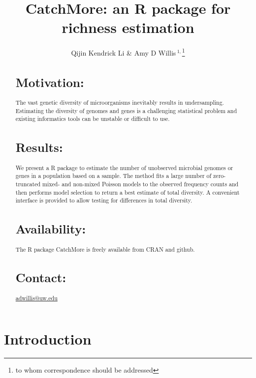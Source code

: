 \documentclass{bioinfo}
\begin{document}

\title[Convenient estimation of species richness]{CatchMore: an R package for richness estimation}
\author[Li \& Willis]{Qijin Kendrick Li \& Amy D Willis\,$^{1,}$\footnote{to whom correspondence should be addressed}
}
\address{$^{1}$Department of Biostatistics, University of Washington.}



\maketitle

\begin{abstract}

\section{Motivation:}
The vast genetic diversity of microorganisms inevitably results in undersampling. Estimating the diversity of genomes and genes is a challenging statistical problem and existing informatics tools can be unstable or difficult to use.

\section{Results:}
We present a R package to estimate the number of unobserved microbial genomes or genes in a population based on a sample. The method fits a large number of zero-truncated mixed- and non-mixed Poisson models to the observed frequency counts and then performs model selection to return a best estimate of total diversity. A convenient interface is provided to allow testing for differences in total diversity.

\section{Availability:}
The R package CatchMore is freely available from CRAN and github.

\section{Contact:} \href{adwillis@uw.edu}{adwillis@uw.edu}
\end{abstract}

\section{Introduction}
\end{document}
